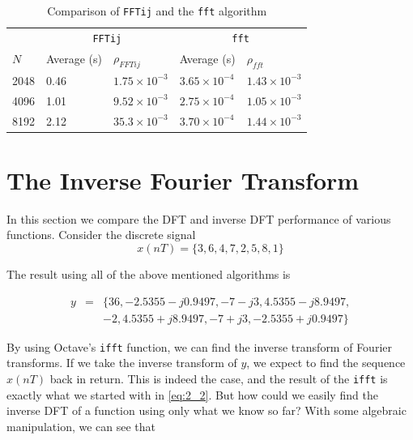 \documentclass[a4paper, 12pt]{report}
\begin{document}
			\begin{table}[H]
				\begin{tabularx}{\textwidth}{X X X X X}
					\toprule
					& \multicolumn{2}{c}{\texttt{FFTij}} & \multicolumn{2}{c}{\texttt{fft}} \\
					$N$ & Average (s) & $\rho_{FFTij}$ & Average (s) & $\rho_{fft}$ \\
					\midrule
					2048 & 0.46 & $1.75 \times 10^{-3}$ & $3.65 \times 10^{-4}$ & $1.43 \times 10^{-3}$ \\
					4096 & 1.01 & $9.52 \times 10^{-3}$ & $2.75 \times 10^{-4}$ & $1.05 \times 10^{-3}$ \\
					8192 & 2.12 & $35.3 \times 10^{-3}$ & $3.70 \times 10^{-4}$ & $1.44 \times 10^{-3}$ \\
					\bottomrule
				\end{tabularx}
				\caption{Comparison of \texttt{FFTij} and the \texttt{fft} algorithm}
				\label{table:dit_vs_fft}
			\end{table}

		\section{The Inverse Fourier Transform} %
		\label{sec:section_name}
			In this section we compare the DFT and inverse DFT performance of various functions. Consider the discrete signal
			\begin{equation}
				x(nT) = \{3, 6, 4, 7, 2, 5, 8, 1\}
				\label{eq:2_2}
			\end{equation}
			

			The result using all of the above mentioned algorithms is

			\[
				\begin{array}{rcl}
					y & = & \{36, -2.5355 - j0.9497, -7 - j3, 4.5355 - j8.9497, \\
					&  & -2, 4.5355 + j8.9497, -7 + j3, -2.5355 + j0.9497\}
				\end{array}
			\]

			By using Octave's \texttt{ifft} function, we can find the inverse transform of Fourier transforms. If we take the inverse transform of $y$, we expect to find the sequence $x(nT)$ back in return. This is indeed the case, and the result of the \texttt{ifft} is exactly what we started with in \eqref{eq:2_2}. But how could we easily find the inverse DFT of a function using only what we know so far? With some algebraic manipulation, we can see that
\end{document}
